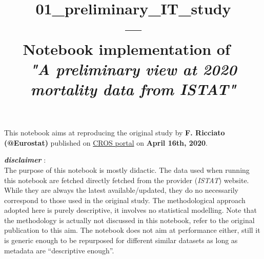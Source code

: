 \documentclass[11pt]{article}
\title{ \textsf{01\_preliminary\_IT\_study} \\ --- \\ Notebook implementation of ~\\ \textit{"A preliminary view at 2020 mortality data from ISTAT"}} %
\date{}
\begin{document}
    
    \maketitle
    
    
    \vspace*{-0.05\textheight}

    

    This notebook aims at reproducing the original study by \textbf{F.
Ricciato (@Eurostat)} published on
\href{https://ec.europa.eu/eurostat/cros/content/preliminary-view-2020-mortality-data-istat}{CROS
portal} on \textbf{April 16th, 2020}.



\textbf{\emph{disclaimer}} :\\
The purpose of this notebook is mostly didactic. The data used when
running this notebook are fetched directly fetched from the provider
(\emph{ISTAT}) website. While they are always the latest
available/updated, they do no necessarily correspond to those used in
the original study. The methodological approach adopted here is purely
descriptive, it involves no statistical modelling. Note that the
methodology is actually not discussed in this notebook, refer to the
original publication to this aim. The notebook does not aim at
performance either, still it is generic enough to be repurposed for
different similar datasets as long as metadata are ``descriptive
enough''.
\end{document}
